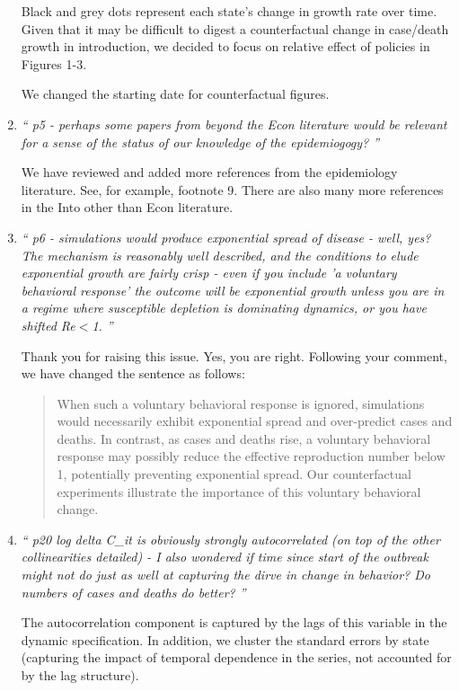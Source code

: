 \documentclass[11pt]{article}
\begin{document}
\begin{enumerate}
Black and grey dots represent each state's change in growth rate over time.  Given that it may be difficult to digest a counterfactual change in case/death growth in introduction, we decided to focus on relative effect of policies in Figures 1-3.
  
We changed the starting date for counterfactual figures.

\item \textit{`` p5 - perhaps some papers from beyond the Econ literature would be relevant for a sense of the status of our knowledge of the epidemiogogy?  ''}

We have reviewed and added more references from the epidemiology literature. See, for example, footnote 9.
There are also many more references in the Into other than Econ literature.

\item \textit{`` p6 - simulations would produce exponential spread of disease - well, yes? The mechanism is reasonably well described, and the conditions to elude exponential growth are fairly crisp - even if you include 'a voluntary behavioral response' the outcome will be exponential growth unless you are in a regime where susceptible depletion is dominating dynamics, or you have shifted Re$<$1.  ''}
 
 Thank you for raising this issue. Yes, you are right. Following your comment, we have changed the sentence as follows:
\begin{quote}
When such a voluntary behavioral response is ignored, simulations would necessarily exhibit exponential spread and over-predict  cases and deaths. In contrast, as cases and deaths rise, a voluntary behavioral response may possibly reduce the effective reproduction number  below 1,  potentially preventing exponential spread. Our counterfactual experiments  illustrate the importance of this voluntary behavioral change. 
\end{quote}
 

\item \textit{`` p20 log delta C\_it is obviously strongly autocorrelated (on top of the other collinearities detailed) - I also wondered if time since start of the outbreak might not do just as well at capturing the dirve in change in behavior? Do numbers of cases and deaths do better? ''}

The autocorrelation component is captured by the lags of this variable in the dynamic specification. In addition,
we cluster the standard errors by state (capturing the impact of temporal dependence in the series, 
not accounted for by the lag structure).


\end{enumerate}
\end{document}
